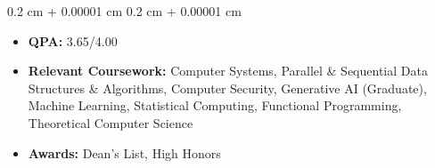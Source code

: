 \documentclass[10pt, letterpaper]{article}
\newenvironment{highlights}{
    \begin{itemize}[
        topsep=0.06 cm,
        parsep=0.06 cm,
        partopsep=0pt,
        itemsep=0pt,
        leftmargin=0.4 cm + 10pt
    ]
}{
    \end{itemize}
} %
\newenvironment{onecolentry}{
    \begin{adjustwidth}{
        0.2 cm + 0.00001 cm
    }{
        0.2 cm + 0.00001 cm
    }
}{
    \end{adjustwidth}
} %
\begin{document}
        \vspace{0.06 cm}
        \begin{onecolentry}
            \begin{highlights}
                \item \textbf{QPA:} 3.65/4.00 
                \item \textbf{Relevant Coursework:} Computer Systems, Parallel \& Sequential Data Structures \& Algorithms, Computer Security, Generative AI (Graduate), Machine Learning, Statistical Computing, Functional Programming, Theoretical Computer Science
                \item \textbf{Awards:} Dean's List, High Honors
            \end{highlights}
        \end{onecolentry}
\end{document}
